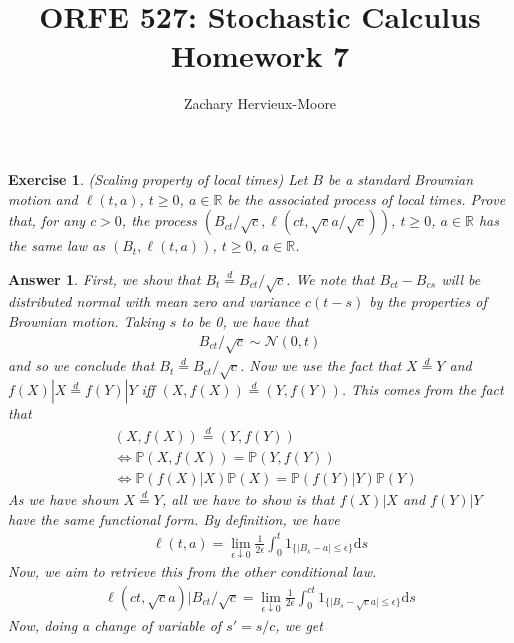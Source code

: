 \documentclass[12pt]{article}
\title{ORFE 527: Stochastic Calculus \\ Homework 7}
\author{Zachary Hervieux-Moore}
\date{\displaydate{date}}
\theoremstyle{colon}
\newtheorem{exercise}{Exercise}
\newtheorem*{answer}{Answer}
\begin{document}
\maketitle

\clearpage

\begin{exercise}
  (Scaling property of local times) Let $B$ be a standard Brownian motion and $\ell(t,a)$, $t \geq 0$, $a \in \mathbb{R}$ be the associated process of local times. Prove that, for any $c > 0$, the process $(B_{ct}/\sqrt{c}, \ell(ct, \sqrt{c}a/\sqrt{c}))$, $t \geq 0$, $a \in \mathbb{R}$ has the same law as $(B_t, \ell(t,a))$, $t \geq 0$, $a \in \mathbb{R}$.
\end{exercise}

\begin{answer}
  First, we show that $B_t \stackrel{d}{=} B_{ct}/\sqrt{c}$. We note that $B_{ct} - B_{cs}$ will be distributed normal with mean zero and variance $c(t-s)$ by the properties of Brownian motion. Taking $s$ to be 0, we have that
  \begin{gather*}
    B_{ct}/\sqrt{c} \sim \mathcal{N}(0,t)
  \end{gather*}
  and so we conclude that $B_t \stackrel{d}{=} B_{ct}/\sqrt{c}$. Now we use the fact that $X \stackrel{d}{=} Y$ and $f(X) | X \stackrel{d}{=} f(Y) | Y$ iff $(X, f(X)) \stackrel{d}{=} (Y,f(Y))$. This comes from the fact that
  \begin{align*}
    &(X, f(X)) \stackrel{d}{=} (Y, f(Y)) \\
    &\Longleftrightarrow \mathbb{P}(X, f(X)) = \mathbb{P}(Y, f(Y)) \\
    &\Longleftrightarrow \mathbb{P}(f(X) | X) \mathbb{P}(X) = \mathbb{P}(f(Y) | Y) \mathbb{P}(Y)
  \end{align*}
  As we have shown $X \stackrel{d}{=} Y$, all we have to show is that $f(X) | X$ and $f(Y) | Y$ have the same functional form. By definition, we have
  \begin{gather*}
    \ell(t,a) = \lim_{\epsilon \downarrow 0} \frac{1}{2 \epsilon} \int_0^t 1_{\{\lvert B_s - a \rvert \leq \epsilon \}} \text{d}s
  \end{gather*}
  Now, we aim to retrieve this from the other conditional law.
  \begin{gather*}
    \ell(ct,\sqrt{c}a) | B_{ct}/\sqrt{c} = \lim_{\epsilon \downarrow 0} \frac{1}{2 \epsilon} \int_0^{ct} 1_{\{\lvert B_{s} - \sqrt{c}a \rvert \leq \epsilon \}} \text{d}s
  \end{gather*}
  Now, doing a change of variable of $s' = s/c$, we get

\end{answer}
\end{document}
